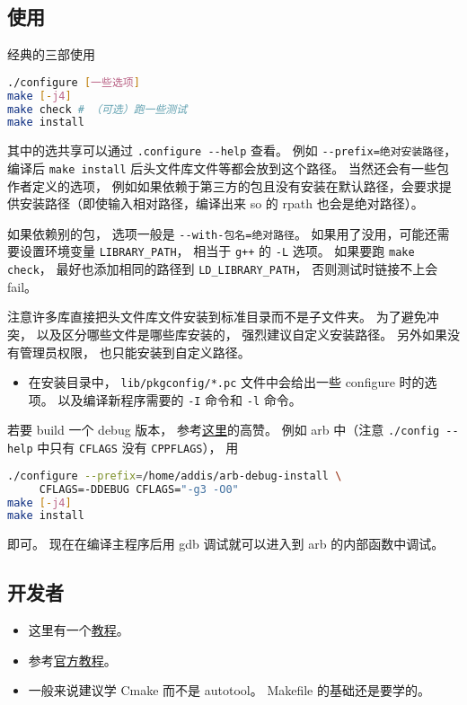 
\begin{issues}
\issueDraft
\end{issues}



\subsection{使用}
经典的三部使用
\begin{lstlisting}[language=bash]
./configure [一些选项]
make [-j4]
make check # （可选）跑一些测试
make install
\end{lstlisting}
其中的选共享可以通过 \verb|.configure --help| 查看。 例如 \verb|--prefix=绝对安装路径|， 编译后 \verb|make install| 后头文件库文件等都会放到这个路径。 当然还会有一些包作者定义的选项， 例如如果依赖于第三方的包且没有安装在默认路径，会要求提供安装路径（即使输入相对路径，编译出来 so 的 rpath 也会是绝对路径）。

如果依赖别的包， 选项一般是 \verb|--with-包名=绝对路径|。 如果用了没用，可能还需要设置环境变量 \verb|LIBRARY_PATH|， 相当于 \verb|g++| 的 \verb|-L| 选项。 如果要跑 \verb|make check|， 最好也添加相同的路径到 \verb|LD_LIBRARY_PATH|， 否则测试时链接不上会 fail。

注意许多库直接把头文件库文件安装到标准目录而不是子文件夹。 为了避免冲突， 以及区分哪些文件是哪些库安装的， 强烈建议自定义安装路径。 另外如果没有管理员权限， 也只能安装到自定义路径。

\begin{itemize}
\item 在安装目录中， \verb|lib/pkgconfig/*.pc| 文件中会给出一些 configure 时的选项。 以及编译新程序需要的 \verb|-I| 命令和 \verb|-l| 命令。
\end{itemize}

若要 build 一个 debug 版本， 参考\href{https://stackoverflow.com/questions/4553735/gnu-autotools-debug-release-targets}{这里}的高赞。 例如 arb 中（注意 \verb|./config --help| 中只有 \verb|CFLAGS| 没有 \verb|CPPFLAGS|）， 用
\begin{lstlisting}[language=bash]
./configure --prefix=/home/addis/arb-debug-install \
     CFLAGS=-DDEBUG CFLAGS="-g3 -O0"
make [-j4]
make install
\end{lstlisting}
即可。 现在在编译主程序后用 gdb 调试就可以进入到 arb 的内部函数中调试。

\subsection{开发者}
\begin{itemize}
\item 这里有一个\href{https://devmanual.gentoo.org/general-concepts/autotools/index.html}{教程}。
\item 参考\href{https://www.gnu.org/software/automake/manual/html_node/Autotools-Introduction.html}{官方教程}。
\item 一般来说建议学 Cmake\upref{CMakeN} 而不是 autotool。 Makefile 的基础还是要学的。
\end{itemize}
